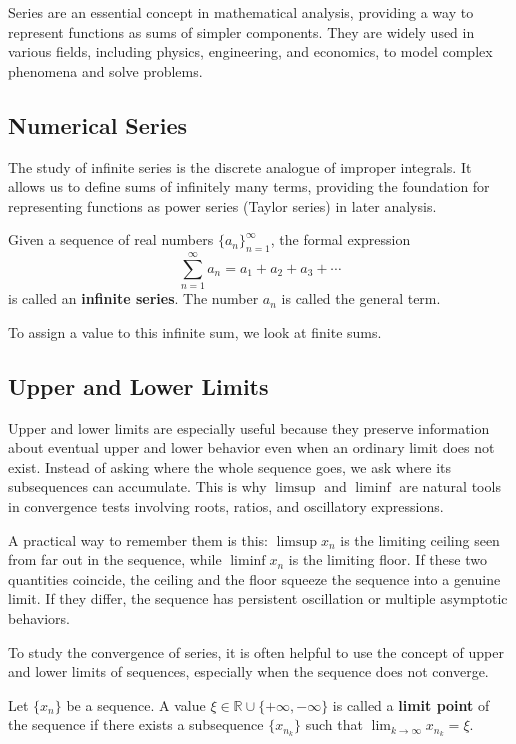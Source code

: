 Series are an essential concept in mathematical analysis, providing a way to represent functions as sums of simpler components. They are widely used in various fields, including physics, engineering, and economics, to model complex phenomena and solve problems.

\subsection{Numerical Series}

The study of infinite series is the discrete analogue of improper integrals. It allows us to define sums of infinitely many terms, providing the foundation for representing functions as power series (Taylor series) in later analysis.

\begin{definition}
Given a sequence of real numbers $\{a_n\}_{n=1}^{\infty}$, the formal expression
\[ \sum_{n=1}^{\infty} a_n = a_1 + a_2 + a_3 + \cdots \]
is called an \textbf{infinite series}. The number $a_n$ is called the general term.
\end{definition}

To assign a value to this infinite sum, we look at finite sums.

\subsection{Upper and Lower Limits}


Upper and lower limits are especially useful because they preserve information about eventual upper and lower behavior even when an ordinary limit does not exist. Instead of asking where the whole sequence goes, we ask where its subsequences can accumulate. This is why $\limsup$ and $\liminf$ are natural tools in convergence tests involving roots, ratios, and oscillatory expressions.

A practical way to remember them is this: $\limsup x_n$ is the limiting ceiling seen from far out in the sequence, while $\liminf x_n$ is the limiting floor. If these two quantities coincide, the ceiling and the floor squeeze the sequence into a genuine limit. If they differ, the sequence has persistent oscillation or multiple asymptotic behaviors.

To study the convergence of series, it is often helpful to use the concept of upper and lower limits of sequences, especially when the sequence does not converge.

\begin{definition}
Let $\{x_n\}$ be a sequence. A value $\xi \in \mathbb{R} \cup \{+\infty, -\infty\}$ is called a \textbf{limit point} of the sequence if there exists a subsequence $\{x_{n_k}\}$ such that $\lim_{k \to \infty} x_{n_k} = \xi$.
\end{definition}

